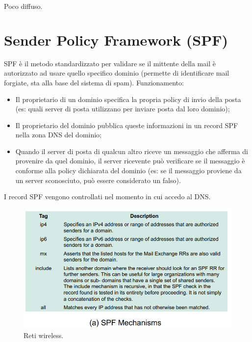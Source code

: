 Poco diffuso.

\section{Sender Policy Framework (SPF)}

SPF è il metodo standardizzato per validare se il mittente della mail è autorizzato ad usare quello specifico dominio (permette di identificare mail forgiate, sta alla base del sistema di spam). 
Funzionamento:
\begin{itemize}
    \item Il proprietario di un dominio specifica la propria policy di invio della posta (es: quali server di posta utilizzano per inviare posta dal loro dominio);
	\item Il proprietario del dominio pubblica queste informazioni in un record SPF nella zona DNS del dominio;
	\item Quando il server di posta di qualcun altro riceve un messaggio che afferma di provenire da quel dominio, il server ricevente può verificare se il messaggio è conforme alla policy dichiarata del dominio (es: se il messaggio proviene da un server sconosciuto, può essere considerato un falso).
\end{itemize}

I record SPF vengono controllati nel momento in cui accedo al DNS.

\begin{figure}[h]
    \centering
    \includegraphics[width=1\textwidth]{images/chapter8/8-1.png}
    \caption{Reti wireless.}
    \label{fig:8-1}
\end{figure}

